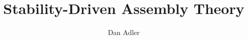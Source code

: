 \documentclass[preprint,12pt]{elsarticle}
\begin{document}
\begin{frontmatter}



\title{Stability-Driven Assembly Theory}


\author{Dan Adler} %



\end{frontmatter}
\end{document}
